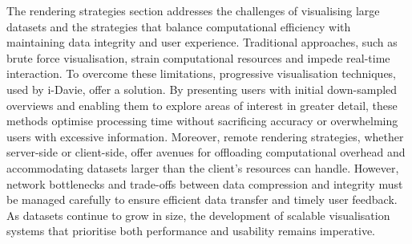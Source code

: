 The rendering strategies section addresses the challenges of visualising large datasets and the strategies that balance computational efficiency with maintaining data integrity and user experience. 
Traditional approaches, such as brute force visualisation, strain computational resources and impede real-time interaction. 
To overcome these limitations, progressive visualisation techniques, used by i-Davie, offer a solution. 
By presenting users with initial down-sampled overviews and enabling them to explore areas of interest in greater detail, these methods optimise processing time without sacrificing accuracy or overwhelming users with excessive information. 
Moreover, remote rendering strategies, whether server-side or client-side, offer avenues for offloading computational overhead and accommodating datasets larger than the client's resources can handle. 
However, network bottlenecks and trade-offs between data compression and integrity must be managed carefully to ensure efficient data transfer and timely user feedback. 
As datasets continue to grow in size, the development of scalable visualisation systems that prioritise both performance and usability remains imperative.


